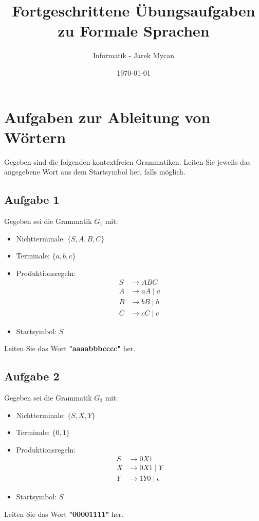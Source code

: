 \documentclass[a4paper,12pt]{article}
\begin{document}
	
	\title{Fortgeschrittene Übungsaufgaben zu Formale Sprachen}
	\author{Informatik - Jarek Mycan}
	\date{\today}
	\maketitle
	
	\section*{Aufgaben zur Ableitung von Wörtern}
	
	Gegeben sind die folgenden kontextfreien Grammatiken. Leiten Sie jeweils das angegebene Wort aus dem Startsymbol her, falls möglich.
	
	\subsection*{Aufgabe 1}
	Gegeben sei die Grammatik $G_1$ mit:
	\begin{itemize}
		\item Nichtterminale: $\{S, A, B, C\}$
		\item Terminale: $\{a, b, c\}$
		\item Produktionsregeln:
		\begin{align*}
			S &\rightarrow A B C \\
			A &\rightarrow a A \mid a \\
			B &\rightarrow b B \mid b \\
			C &\rightarrow c C \mid c
		\end{align*}
		\item Startsymbol: $S$
	\end{itemize}
	Leiten Sie das Wort \textbf{"aaaabbbcccc"} her.
	
	\subsection*{Aufgabe 2}
	Gegeben sei die Grammatik $G_2$ mit:
	\begin{itemize}
		\item Nichtterminale: $\{S, X, Y\}$
		\item Terminale: $\{0, 1\}$
		\item Produktionsregeln:
		\begin{align*}
			S &\rightarrow 0 X 1 \\
			X &\rightarrow 0 X 1 \mid Y \\
			Y &\rightarrow 1 Y 0 \mid \epsilon
		\end{align*}
		\item Startsymbol: $S$
	\end{itemize}
	Leiten Sie das Wort \textbf{"00001111"} her.
	
\end{document}
